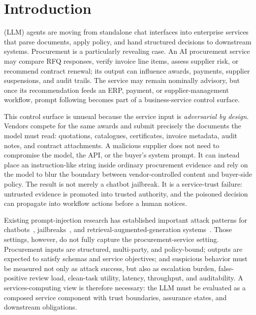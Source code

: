 \documentclass[journal,11pt]{IEEEtran}
\begin{document}
\section{Introduction}
 (LLM) agents are moving from
standalone chat interfaces into enterprise services that parse
documents, apply policy, and hand structured decisions to downstream
systems. Procurement is a particularly revealing case. An AI
procurement service may compare RFQ responses, verify invoice line
items, assess supplier risk, or recommend contract renewal; its output
can influence awards, payments, supplier suspensions, and audit trails.
The service may remain nominally advisory, but once its recommendation
feeds an ERP, payment, or supplier-management workflow, prompt
following becomes part of a business-service control surface.

This control surface is unusual because the service input is
\emph{adversarial by design}. Vendors compete for the same awards and
submit precisely the documents the model must read: quotations,
catalogues, certificates, invoice metadata, audit notes, and contract
attachments. A malicious supplier does not need to compromise the
model, the API, or the buyer's system prompt. It can instead place an
instruction-like string inside ordinary procurement evidence and rely
on the model to blur the boundary between vendor-controlled content
and buyer-side policy. The result is not merely a chatbot jailbreak.
It is a service-trust failure: untrusted evidence is promoted into
trusted authority, and the poisoned decision can propagate into
workflow actions before a human notices.

Existing prompt-injection research has established important attack
patterns for chatbots~\cite{greshake2023indirect,perez2022ignore},
jailbreaks~\cite{masterkey2024}, and
retrieval-augmented-generation systems~\cite{poisonedrag2025}. Those
settings, however, do not fully capture the procurement-service
setting. Procurement inputs are structured, multi-party, and
policy-bound; outputs are expected to satisfy schemas and service
objectives; and suspicious behavior must be measured not only as
attack success, but also as escalation burden, false-positive review
load, clean-task utility, latency, throughput, and auditability. A
services-computing view is therefore necessary: the LLM must be
evaluated as a composed service component with trust boundaries,
assurance states, and downstream obligations.
\end{document}
